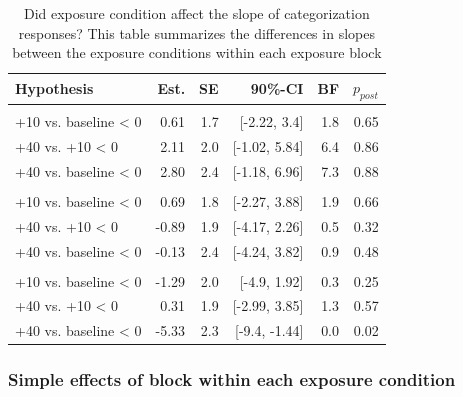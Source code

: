 \documentclass[
  11pt,
  man,mask,floatsintext]{apa6}
\begin{document}
\begin{table}[H]
\centering
\caption{\label{tab:hypothesis-table-exposure-simple-slopes-condition}Did exposure condition affect the slope of categorization responses? This table summarizes the differences in slopes between the exposure conditions within each exposure block}
\centering
\begin{tabular}[t]{>{\raggedright\arraybackslash}p{15em}rrrrr}
\toprule
Hypothesis & Est. & SE & 90\%-CI & BF & $p_{post}$\\
\midrule
\addlinespace[0.3em]
\multicolumn{6}{l}{\textbf{Exposure block 1}}\\
\hspace{1em}+10 vs. baseline < 0 & 0.61 & 1.7 & {}[-2.22, 3.4] & 1.8 & 0.65\\
\hspace{1em}+40 vs. +10 < 0 & 2.11 & 2.0 & {}[-1.02, 5.84] & 6.4 & 0.86\\
\hspace{1em}+40 vs. baseline < 0 & 2.80 & 2.4 & {}[-1.18, 6.96] & 7.3 & 0.88\\
\addlinespace[0.3em]
\multicolumn{6}{l}{\textbf{Exposure block 2}}\\
\hspace{1em}+10 vs. baseline < 0 & 0.69 & 1.8 & {}[-2.27, 3.88] & 1.9 & 0.66\\
\hspace{1em}+40 vs. +10 < 0 & -0.89 & 1.9 & {}[-4.17, 2.26] & 0.5 & 0.32\\
\hspace{1em}+40 vs. baseline < 0 & -0.13 & 2.4 & {}[-4.24, 3.82] & 0.9 & 0.48\\
\addlinespace[0.3em]
\multicolumn{6}{l}{\textbf{Exposure block 3}}\\
\hspace{1em}+10 vs. baseline < 0 & -1.29 & 2.0 & {}[-4.9, 1.92] & 0.3 & 0.25\\
\hspace{1em}+40 vs. +10 < 0 & 0.31 & 1.9 & {}[-2.99, 3.85] & 1.3 & 0.57\\
\hspace{1em}+40 vs. baseline < 0 & -5.33 & 2.3 & {}[-9.4, -1.44] & 0.0 & 0.02\\
\bottomrule
\end{tabular}
\end{table}

\subsubsection{Simple effects of block within each exposure condition}\label{simple-effects-of-block-within-each-exposure-condition-2}
\end{document}
